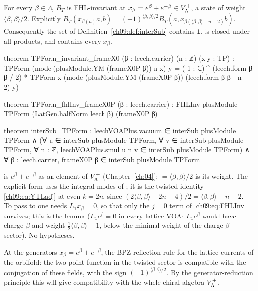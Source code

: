 \begin{theorem}\label{ch09:thm:TPgen}
For every $\beta\in\Lambda$, $B_T$ is FHL-invariant at $x_\beta=e^\beta+e^{-\beta}\in V_{\Lambda}^{+}$,
a state of weight $\langle\beta,\beta\rangle/2$. Explicitly
$B_T(x_{\beta(n)}a,b)=(-1)^{\langle\beta,\beta\rangle/2}B_T(a,x_{\beta(\langle\beta,\beta\rangle-n-2)}b)$.
Consequently the set  of Definition~\ref{ch09:def:interSub} contains
$\mathbf1$, is closed under all products, and contains every $x_\beta$.
\end{theorem}
\begin{leancode}
theorem TPForm_invariant_frameX0 (β : leech.carrier) (n : ℤ) (x y : TP) :
    TPForm (mode (plusModule.YM (frameX0P β)) n x) y
      = (-1 : ℂ) ^ (leech.form β β / 2) *
          TPForm x (mode (plusModule.YM (frameX0P β)) (leech.form β β - n - 2) y)

theorem TPForm_fhlInv_frameX0P (β : leech.carrier) :
    FHLInv plusModule TPForm (LatGen.halfNorm leech β) (frameX0P β)

theorem interSub_TPForm :
    leechVOAPlus.vacuum ∈ interSub plusModule TPForm ∧
    (∀ u ∈ interSub plusModule TPForm, ∀ v ∈ interSub plusModule TPForm, ∀ n : ℤ,
      leechVOAPlus.smul u n v ∈ interSub plusModule TPForm) ∧
    ∀ β : leech.carrier, frameX0P β ∈ interSub plusModule TPForm
\end{leancode}
\begin{dictionary}
 is $e^\beta+e^{-\beta}$ as an element of $V_{\Lambda}^{+}$ (Chapter~\ref{ch:04});
 $=\langle\beta,\beta\rangle/2$ is its weight. The explicit form uses
the integral modes of ; it is the twisted identity \eqref{ch09:eq:YTLadj} at even
$k=2n$, since $(2\langle\beta,\beta\rangle-2n-4)/2=\langle\beta,\beta\rangle-n-2$. To pass to
 one needs $L_1x_\beta=0$, so that only the $j=0$ term of \eqref{ch09:eq:FHLInv}
survives; this is the lemma  ($L_1e^\beta=0$ in every lattice VOA:
$L_1e^\beta$ would have charge $\beta$ and weight $\frac12\langle\beta,\beta\rangle-1$, below the
minimal weight of the charge-$\beta$ sector). No hypotheses.
\end{dictionary}

\begin{physics}
At the generators $x_\beta=e^\beta+e^{-\beta}$, the BPZ reflection rule for the lattice currents of the orbifold: the two-point function in the twisted sector is compatible with the conjugation of these fields, with the sign $(-1)^{\langle\beta,\beta\rangle/2}$. By the generator-reduction principle this will give compatibility with the whole chiral algebra $V_{\Lambda}^{+}$.
\end{physics}

